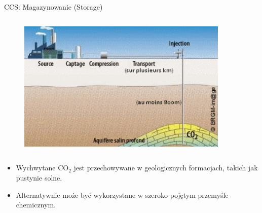\begin{columnframe}{CCS: Magazynowanie (Storage)}
    \begin{column}{0.5\textwidth}
        \begin{figure}
            \centering
            \includegraphics[width=0.9\textwidth, frame]{images/La-chaine-de-valeur-transporter-le-CO2.jpg}
        \end{figure}
    \end{column}
    \begin{column}{0.5\textwidth}
        \begin{itemize}
            \item Wychwytane CO$_2$ jest przechowywane w geologicznych formacjach, takich jak pustynie solne.
            \item Alternatywnie może być wykorzystane w szeroko pojętym przemyśle chemicznym.
        \end{itemize}
    \end{column}
\end{columnframe}


